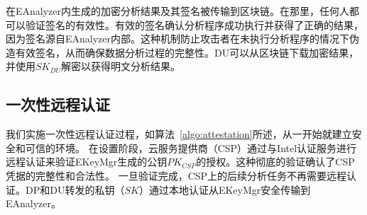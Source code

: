 在EAnalyzer内生成的加密分析结果及其签名被传输到区块链。在那里，任何人都可以验证签名的有效性。有效的签名确认分析程序成功执行并获得了正确的结果，因为签名源自EAnalyzer内部。这种机制防止攻击者在未执行分析程序的情况下伪造有效签名，从而确保数据分析过程的完整性。DU可以从区块链下载加密结果，并使用$SK_{DU}$解密以获得明文分析结果。


\subsection{一次性远程认证}
我们实施一次性远程认证过程，如算法~\ref{algo:attestation}所述，从一开始就建立安全和可信的环境。 
在设置阶段，云服务提供商（CSP）通过与Intel认证服务进行远程认证来验证EKeyMgr生成的公钥$PK_{CSP}$的授权。这种彻底的验证确认了CSP凭据的完整性和合法性。
一旦验证完成，CSP上的后续分析任务不再需要远程认证。DP和DU转发的私钥（$SK$）通过本地认证从EKeyMgr安全传输到EAnalyzer。
